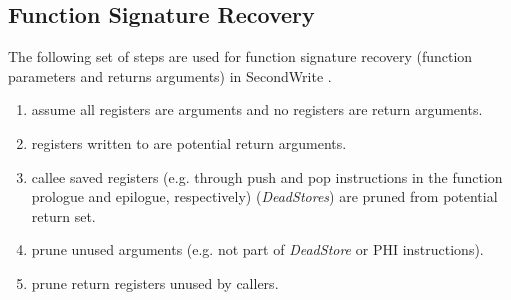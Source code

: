 
\subsection{Function Signature Recovery}



The following set of steps are used for function signature recovery (function parameters and returns arguments) in SecondWrite \cite{second_write_scalable_type_detection}.

\begin{enumerate}
	\item assume all registers are arguments and no registers are return arguments.
	\item registers written to are potential return arguments.
	\item callee saved registers (e.g. through push and pop instructions in the function prologue and epilogue, respectively) (\textit{DeadStores}) are pruned from potential return set.
	\item prune unused arguments (e.g. not part of \textit{DeadStore} or PHI instructions).
	\item prune return registers unused by callers.
\end{enumerate}
